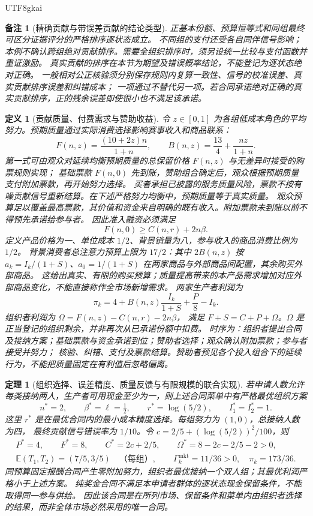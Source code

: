 \documentclass[12pt,a4paper,openany]{report}
\newtheorem{definition}{定义}[chapter]
\newtheorem{theorem}{定理}[chapter]
\newtheorem{remark}{备注}[chapter]
\newcommand{\EE}{\mathbb E}
\begin{document}
\begin{CJK*}{UTF8}{gkai}
\begin{remark}[精确贡献与带误差贡献的结论类型]
正基本份额、预算恒等式和同组最终可区分证据评分的严格排序逐状态成立。
不同组的支付还受各自同伴信号影响；本例不确认跨组绝对贡献排序。需要全组织排序时，须另设统一比较与支付函数并重证激励。
真实贡献的排序在本节为期望及错误概率结论，不能登记为逐状态绝对正确。
一般相对公正核验须分别保存规则内复算一致性、信号的校准误差、真实贡献排序误差和纠错成本；
一项通过不替代另一项。若合同承诺绝对正确的真实贡献排序，正的残余误差即使很小也不满足该承诺。
\end{remark}

\begin{definition}[贡献质量、付费需求与赞助收益]
\label{def:quality-feedback-demand}
令 \(z\in[0,1]\) 为各组低成本角色的平均努力。预期质量通过实际消费选择影响赛事收入和商品联系：
\[
 F(n,z)=\frac{(10+2z)n}{1+n},\qquad
 B(n,z)=\frac{13}{4}+\frac{nz}{1+n}.
\]
第一式可由观众对延续均衡预期质量的总保留价格 \(F(n,z)\) 与无差异时接受的购票规则实现；
基础票款 \(F(n,0)\) 先到账，赞助组合确定后，观众根据预期质量支付附加票款，再开始努力选择。
买者承担已披露的服务质量风险，票款不按有噪贡献信号重新结算。在下述严格努力均衡中，预期质量等于真实质量。
观众预算足以覆盖最高票款，其价值和资金来自明确的既有收入。附加票款未到账以前不得预先承诺给参与者。
因此准入融资必须满足
\[
 F(n,0)\ge C(n,r)+2n\beta.
\]
定义产品价格为一、单位成本 \(1/2\)、背景销量为八，参与收入的商品消费比例为 \(1/2\)。
背景消费者总注意力预算上限为 \(17/2\)：其中 \(2B(n,z)\) 按
\(a_k=I_k/(1+S)\)、\(a_0=1/(1+S)\) 在两家商品与外部商品间配置，其余购买外部商品。
这给出真实、有限的购买预算；质量提高带来的本产品需求增加对应外部商品变化，不能直接称作全市场新增需求。
两家生产者利润为
\[
 \pi_k=4+B(n,z)\frac{I_k}{1+S}+\frac{P}{8}-I_k.
\]
组织者利润为 \(\Omega=F(n,z)-C(n,r)-2n\beta\)，
满足 \(F+S=C+P+\Omega\)。\(\Omega\) 是正当登记的组织剩余，并非再次从已承诺份额中扣费。
时序为：组织者提出合同及接纳方案；基础票款与资金承诺到位；赞助者选择；观众确认附加票款；参与者接受并努力；
核验、纠错、支付及票款结算。赞助者预见各个投入组合下的延续行为，不能把质量固定在有利值后忽略偏离。
\end{definition}

\begin{theorem}[组织选择、误差精度、质量反馈与有限规模的联合实现]
\label{thm:endogenous-organization-contract}
若申请人数允许每类接纳两人，生产者可用现金至少为一，则上述合同菜单中有严格最优组织方案
\[
 n^*=2,\qquad \beta^*=\ell=\tfrac12,\qquad
 r^*=\log(5/2),\qquad I_1^*=I_2^*=1.
\]
这里 \(r^*\) 是在最优合同内的最小成本精度选择。每组努力为 \((1,0)\)，总接纳人数为四，
最终贡献信号错误率为 \(1/10\)。令 \(c=2/5+(\log(5/2))^2/100\)，则
\[
 \begin{gathered}
 P^*=4,\qquad F^*=8,\qquad C^*=2c+2/5,\qquad
 \Omega^*=8-2c-2/5-2>0,\\
 \EE(T_1,T_2)=(7/5,3/5)\quad\text{（每组）},\qquad
 \Gamma_k^{\mathrm{mkt}}=11/36>0,\quad \pi_k=173/36.
 \end{gathered}
\]
同预算固定报酬合同产生零附加努力，组织者最优接纳一个双人组；其最优利润严格小于上述方案。
纯奖金合同不满足本申请者群体的逐状态现金保留条件，不能取得同一参与供给。
因此该合同是在所列市场、保留条件和菜单内由组织者选择的结果，而非全体市场必然采用的唯一合同。
\end{theorem}


\end{CJK*}
\end{document}
